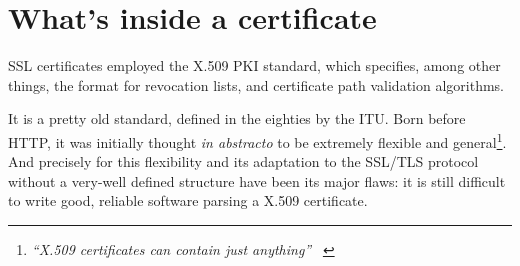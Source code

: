 \section{What's inside a certificate \label{sec:ssl:x509}}
SSL certificates employed the X.509 PKI standard, which specifies, among other
things, the format for revocation lists, and certificate path validation
algorithms.
\\
\begin{center}
\end{center}

It is a pretty old standard, defined in the eighties by the ITU.
Born before HTTP, it was initially thought \emph{in abstracto} to be
extremely flexible and general\footnote{
  \textit{``X.509 certificates can contain just anything''} ~\cite{SSLiverse}
}.
And precisely for this flexibility and its adaptation to the SSL/TLS protocol
without a very-well defined structure have been its major flaws: it is still
difficult to write good, reliable software parsing a X.509 certificate.

